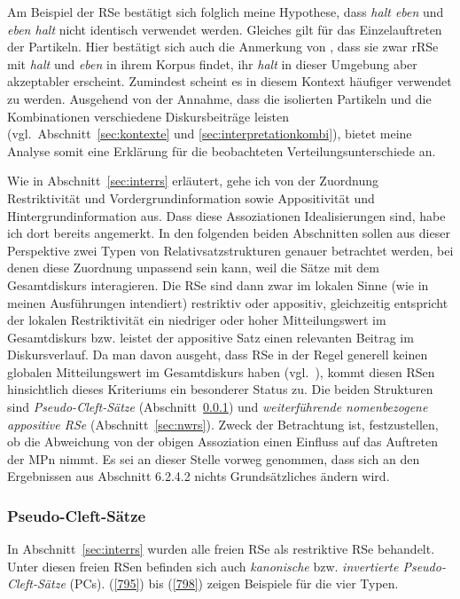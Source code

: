 Am Beispiel der RSe bestätigt sich folglich meine Hypothese, dass \textit{halt eben} und \textit{eben halt} nicht identisch verwendet werden. Gleiches gilt für das Einzelauftreten der Partikeln. Hier bestätigt sich auch die Anmerkung von \citet[80, Fn 104]{Thurmair1989}, dass sie zwar rRSe mit \textit{halt} und \textit{eben} in ihrem Korpus findet, ihr \textit{halt} in dieser Umgebung aber akzeptabler erscheint. Zumindest scheint es in diesem Kontext häufiger verwendet zu werden. Ausgehend von der Annahme, dass die isolierten Partikeln und die Kombinationen verschiedene Diskursbeiträge leisten (vgl.\ Abschnitt~\ref{sec:kontexte} und \ref{sec:interpretationkombi}), bietet meine Analyse somit eine Erklärung für die beobachteten Verteilungsunterschiede an. 

Wie in Abschnitt~\ref{sec:interrs} erläutert, gehe ich von der Zuordnung Restriktivität und Vordergrundinformation sowie Appositivität und Hintergrundinformation aus. Dass diese Assoziationen Idealisierungen sind, habe ich dort bereits angemerkt. In den folgenden beiden Abschnitten sollen aus dieser Perspektive zwei Typen von Relativsatzstrukturen genauer betrachtet werden, bei denen diese Zuordnung unpassend sein kann, weil die Sätze mit dem Gesamtdiskurs interagieren. Die RSe sind dann zwar im lokalen Sinne (wie in meinen Ausführungen intendiert) restriktiv oder appositiv, gleichzeitig entspricht der lokalen Restriktivität ein niedriger oder hoher Mitteilungswert im Gesamtdiskurs bzw. leistet der appositive Satz einen relevanten Beitrag im Diskursverlauf. Da man davon ausgeht, dass RSe in der Regel generell keinen globalen Mitteilungswert im Gesamtdiskurs haben (vgl.\ \citealt[38--42]{Antomo2015}), kommt diesen RSen hinsichtlich dieses Kriteriums ein besonderer Status zu. Die beiden Strukturen sind  \textit{Pseudo-Cleft-Sätze} (Abschnitt~\ref{sec:pcs}) und \textit{weiterführende nomenbezogene appositive RSe} (Abschnitt~\ref{sec:nwrs}). Zweck der Betrachtung ist, festzustellen, ob die Abweichung von der obigen Assoziation einen Einfluss auf das Auftreten der MPn nimmt. Es sei an dieser Stelle vorweg genommen, dass sich an den Ergebnissen aus Abschnitt 6.2.4.2 nichts Grundsätzliches ändern wird.

\subsubsection{Pseudo-Cleft-Sätze}
\label{sec:pcs}
In Abschnitt~\ref{sec:interrs} wurden alle freien RSe  als restriktive RSe behandelt. Unter diesen freien RSen befinden sich auch \textit{kanonische} bzw. \textit{invertierte Pseudo-Cleft-Sätze} (PCs). (\ref{795}) bis (\ref{798}) zeigen Beispiele für die vier Typen.

